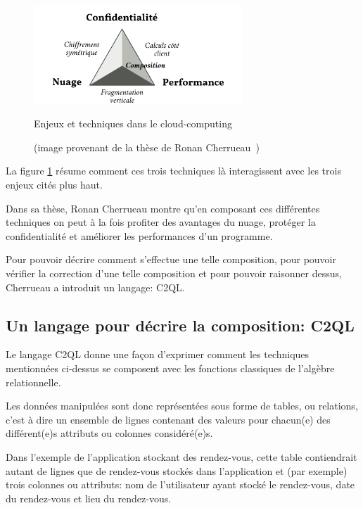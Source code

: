 \begin{figure}
	\begin{center}
		\includegraphics[width=0.7\textwidth]{snps.png}
		\caption{Enjeux et techniques dans le cloud-computing}
		\caption*{(image provenant de la thèse de Ronan Cherrueau~\cite{rc:these})}
		\label{enjeux}
	\end{center}
\end{figure}

La figure \ref{enjeux} résume comment ces trois techniques
là interagissent avec les trois enjeux cités plus haut.

Dans sa thèse, Ronan Cherrueau montre qu'en composant ces différentes techniques
on peut à la fois profiter des avantages du nuage, protéger la confidentialité
et améliorer les performances d'un programme.

Pour pouvoir décrire comment s'effectue une telle composition,
pour pouvoir vérifier la correction d'une telle composition et
pour pouvoir raisonner dessus, Cherrueau a introduit un langage: C2QL.

\subsection{Un langage pour décrire la composition: C2QL}
\label{descrC2QL}
Le langage C2QL donne une façon d'exprimer comment les techniques
mentionnées ci-dessus se composent avec les fonctions classiques de l'algèbre relationnelle.

Les données manipulées sont donc représentées sous forme de tables, ou relations,
c'est à dire un ensemble de lignes contenant des valeurs pour chacun(e) des 
différent(e)s attributs ou colonnes considéré(e)s.

Dans l'exemple de l'application stockant des rendez-vous, cette
table contiendrait autant de lignes que de rendez-vous stockés 
dans l'application et (par exemple) trois colonnes ou attributs: 
nom de l'utilisateur
ayant stocké le rendez-vous, date du rendez-vous et lieu du rendez-vous.

